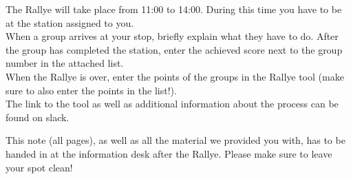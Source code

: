 The Rallye will take place from 11:00 to 14:00. During this time you have to be at the station assigned to you. \\

When a group arrives at your stop, briefly explain what they have to do. After the group has completed the station, enter the achieved score next to the group number in the attached list.\\

When the Rallye is over, enter the points of the groups in the Rallye tool (make sure to also enter the points in the list!). \\
The link to the tool as well as additional information about the process can be found on slack.

This note (all pages), as well as all the material we provided you with, has to be handed in at the information desk after the Rallye. Please make sure to leave your spot clean! 

